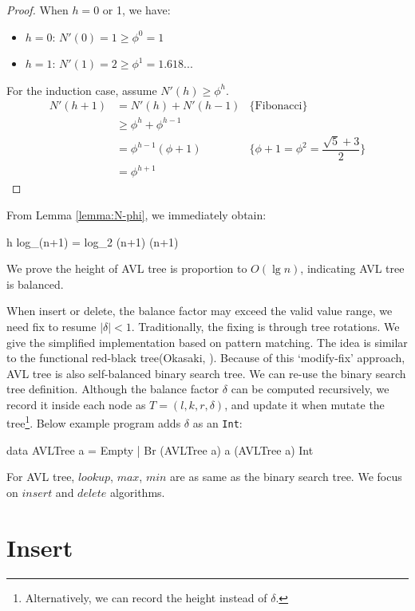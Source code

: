 \documentclass[b5paper]{article}
\begin{document}
\begin{proof}
When $h = 0$ or 1, we have:
\begin{itemize}
\item $h = 0$: $N'(0) = 1 \geq \phi^0 = 1$
\item $h = 1$: $N'(1) = 2 \geq \phi^1 = 1.618...$
\end{itemize}

For the induction case, assume $N'(h) \geq \phi^h$.
\[
  \begin{array}{rll}
  N'(h+1) & = N'(h) + N'(h-1) & \{\text{Fibonacci}\} \\
          & \geq \phi^h + \phi^{h-1} & \\
          & = \phi^{h-1}(\phi + 1) & \{\phi + 1 = \phi^2 = \dfrac{\sqrt{5}+3}{2}\} \\
          & = \phi^{h+1}
 \end{array}
\]
\end{proof}

From Lemma \ref{lemma:N-phi}, we immediately obtain:

\be
  h \leq log_{\phi}(n+1) = log_{\phi}2 \cdot \lg (n+1)  \lg (n+1)
  \label{eq:AVL-height}
\ee

We prove the height of AVL tree is proportion to $O(\lg n)$, indicating AVL tree is balanced.

When insert or delete, the balance factor may exceed the valid value range, we need fix to resume $|\delta|<1$. Traditionally, the fixing is through tree rotations. We give the simplified implementation based on pattern matching. The idea is similar to the functional red-black tree(Okasaki, \cite{okasaki}). Because of this `modify-fix' approach, AVL tree is also self-balanced binary search tree. We can re-use the binary search tree definition. Although the balance factor $\delta$ can be computed recursively, we record it inside each node as $T = (l, k, r, \delta)$, and update it when mutate the tree\footnote{Alternatively, we can record the height instead of $\delta$\cite{py-avl}.}. Below example program adds $\delta$ as an \texttt{Int}:

\lstset{frame = single}
\begin{Haskell}
data AVLTree a = Empty
               | Br (AVLTree a) a (AVLTree a) Int
\end{Haskell}

For AVL tree, $lookup$, $max$, $min$ are as same as the binary search tree. We focus on $insert$ and $delete$ algorithms.

\section{Insert}
\end{document}
